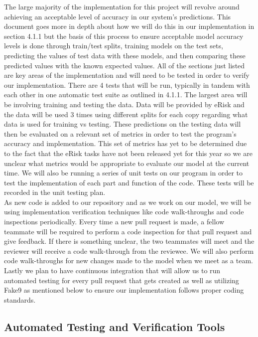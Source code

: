 \documentclass[12pt, titlepage]{article}
\begin{document}
  The large majority of the implementation for this project will revolve around achieving an acceptable level of accuracy in our system’s predictions. This document goes more in depth about how we will do this in our implementation in section 4.1.1 but the basis of this process to ensure acceptable model accuracy levels is done through train/test splits, training models on the test sets, predicting the values of test data with these models, and then comparing these predicted values with the known expected values. All of the sections just listed are key areas of the implementation and will need to be tested in order to verify our implementation. There are 4 tests that will be run, typically in tandem with each other in one automatic test suite as outlined in 4.1.1. The largest area will be involving training and testing the data. Data will be provided by eRisk and the data will be used 3 times using different splits for each copy regarding what data is used for training vs testing. These predictions on the testing data will then be evaluated on a relevant set of metrics in order to test the program's accuracy and implementation. This set of metrics has yet to be determined due to the fact that the eRisk tasks have not been released yet for this year so we are unclear what metrics would be appropriate to evaluate our model at the current time. We will also be running a series of unit tests on our program in order to test the implementation of each part and function of the code. These tests will be recorded in the unit testing plan.\\
    
  As new code is added to our repository and as we work on our model, we will be using implementation verification techniques like code walk-throughs and code inspections periodically. Every time a new pull request is made, a fellow teammate will be required to perform a code inspection for that pull request and give feedback. If there is something unclear, the two teammates will meet and the reviewer will receive a code walk-through from the reviewee. We will also perform code walk-throughs for new changes made to the model when we meet as a team. Lastly we plan to have continuous integration that will allow us to run automated testing for every pull request that gets created as well as utilizing Fake9 as mentioned below to ensure our implementation follows proper coding standards.
  
  
  \subsection{Automated Testing and Verification Tools}
  
\end{document}
